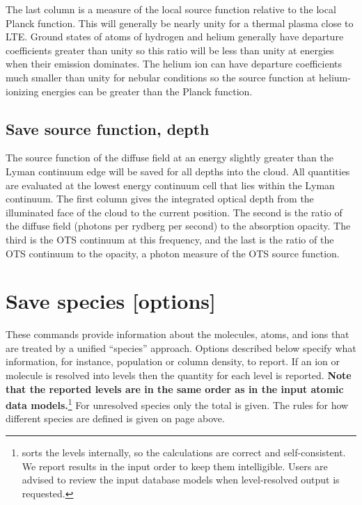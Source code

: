 The last column is a measure of the local source function relative to
the local Planck function.
This will generally be nearly unity for a thermal
plasma close to LTE.
Ground states of atoms of hydrogen and helium generally
have departure coefficients greater than unity so this ratio will be less
than unity at energies when their emission dominates.  The helium ion can
have departure coefficients much smaller than unity for nebular conditions
so the source function at helium-ionizing energies can be greater than the
Planck function.

\subsection{Save source function, depth}

The source function of the diffuse field at an energy slightly greater
than the Lyman continuum edge will be saved for all depths into the cloud.
All quantities are evaluated at the lowest energy continuum cell that lies
within the Lyman continuum.  The first column gives the integrated optical
depth from the illuminated face of the cloud to the current position.  The
second is the ratio of the diffuse field (photons per rydberg per second)
to the absorption opacity.  The third is the OTS continuum at this frequency,
and the last is the ratio of the OTS continuum to the opacity, a photon
measure of the OTS source function.

\section{Save species [options]}
\label{sec:SaveSpecies}

These commands provide information about the molecules, atoms, and ions that are
treated by a unified ``species'' approach.
Options described below specify what information, for instance,
population or column density, to report.
If an ion or molecule is resolved into levels then the quantity for each
level is reported.
\textbf{Note that the reported levels are in the same order as in the input
atomic data models.}\footnote{\Cloudy{} sorts the levels internally, so the
calculations are correct and self-consistent.
We report results in the input order to keep them intelligible.
Users are advised to review the input database models when level-resolved output
is requested.}
For unresolved species only the total is given.
The rules for how different species are defined is given on 
page \pageref{sec:SpeciesDefine} above.


